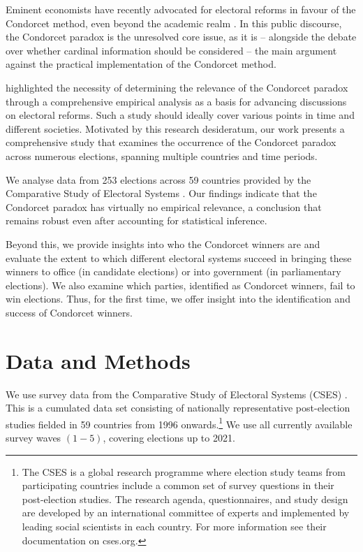 \documentclass[12pt]{scrartcl}
\newcommand{\nbelections}{253 }
\newcommand{\nbcountries}{59 }
\begin{document}
Eminent economists have recently advocated for electoral reforms in favour of the Condorcet method, even beyond the academic realm \citep{Maskin2016, Maskin2017, Maskin2017a}. In this public discourse, the Condorcet paradox is the unresolved core issue, as it is -- alongside the debate over whether cardinal information should be considered -- the main argument against the practical implementation of the Condorcet method.

\citet[Ch.~10.2]{Sen2017} highlighted the necessity of determining the relevance of the Condorcet paradox through a comprehensive empirical analysis as a basis for advancing discussions on electoral reforms. Such a study should ideally cover various points in time and different societies. Motivated by this research desideratum, our work presents a comprehensive study that examines the occurrence of the Condorcet paradox across numerous elections, spanning multiple countries and time periods. 

We analyse data from \nbelections elections across \nbcountries countries provided by the Comparative Study of Electoral Systems \citep{CSES2020}. Our findings indicate that the Condorcet paradox has virtually no empirical relevance, a conclusion that remains robust even after accounting for statistical inference. 

Beyond this, we provide insights into who the Condorcet winners are and evaluate the extent to which different electoral systems succeed in bringing these winners to office (in candidate elections) or into government (in parliamentary elections). We also examine which parties, identified as Condorcet winners, fail to win elections. Thus, for the first time, we offer insight into the identification and success of Condorcet winners.

\section{Data and Methods}\label{sec.datamethods}  
We use survey data from the Comparative Study of Electoral Systems (CSES) \citep{CSES2020}. This is a cumulated data set consisting of nationally representative post-election studies fielded in 59 countries from 1996 onwards.\footnote{
    The CSES is a global research programme where election study teams from participating countries include a common set of survey questions in their post-election studies. The research agenda, questionnaires, and study design are developed by an international committee of experts and implemented by leading social scientists in each country. For more information see their documentation on cses.org.
} We use all currently available survey waves $(1-5)$, covering elections up to 2021.
\end{document}
